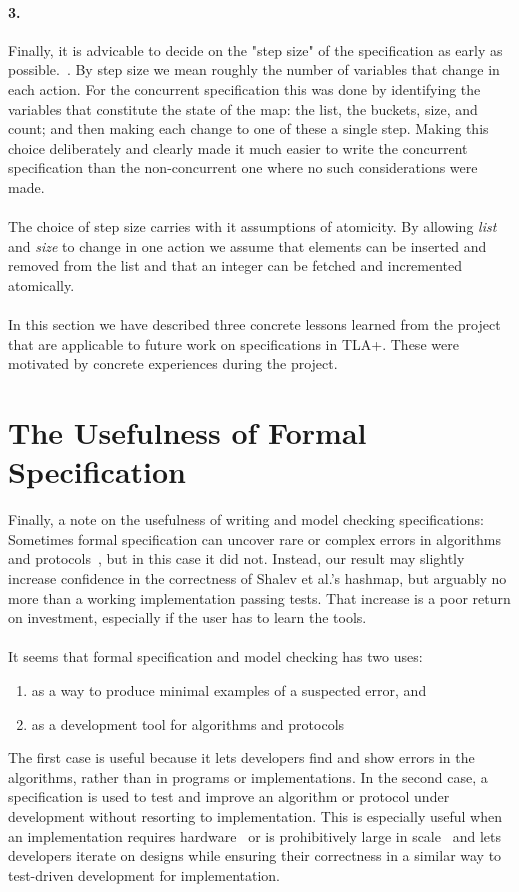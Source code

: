 \documentclass{uit-thesis}
\begin{document}
\paragraph{3.}%
Finally, it is advicable to decide on the "step size" of the specification as early as possible.~\cite{Lamport_video_2019}. By step size we mean roughly the number of variables that change in each action. For the concurrent specification this was done by identifying the variables that constitute the state of the map: the list, the buckets, size, and count; and then making each change to one of these a single step. Making this choice deliberately and clearly made it much easier to write the concurrent specification than the non-concurrent one where no such considerations were made.
\\\\
The choice of step size carries with it assumptions of atomicity. By allowing \textit{list} and \textit{size} to change in one action we assume that elements can be inserted and removed from the list and that an integer can be fetched and incremented atomically.
\\\\
In this section we have described three concrete lessons learned from the project that are applicable to future work on specifications in TLA+. These were motivated by concrete experiences during the project.

\section{The Usefulness of Formal Specification}
Finally, a note on the usefulness of writing and model checking specifications: Sometimes formal specification can uncover rare or complex errors in algorithms and protocols~\cite{Lund2019, Zave2012}, but in this case it did not. Instead, our result may slightly increase confidence in the correctness of Shalev et al.'s hashmap, but arguably no more than a working implementation passing tests. That increase is a poor return on investment, especially if the user has to learn the tools.
\\\\
It seems that formal specification and model checking has two uses:
\begin{enumerate}
    \item as a way to produce minimal examples of a suspected error, and \label{point:error}
    \item as a development tool for algorithms and protocols \label{point:dev}
\end{enumerate}
The first case is useful because it lets developers find and show errors in the algorithms, rather than in programs or implementations. In the second case, a specification is used to test and improve an algorithm or protocol under development without resorting to implementation. This is especially useful when an implementation requires hardware~\cite{Lamport-Batson2002} or is prohibitively large in scale~\cite{Amazon2015} and lets developers iterate on designs while ensuring their correctness in a similar way to test-driven development for implementation.
\end{document}
